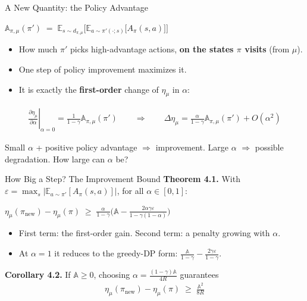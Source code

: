 \documentclass[aspectratio=169]{beamer}
\newcommand{\E}{\mathbb{E}}
\newcommand{\PA}{\mathbb{A}}              %
\newcommand{\pinew}{\pi_{\mathrm{new}}}
\begin{document}
\begin{frame}{A New Quantity: the Policy Advantage}
  \begin{formulabox}
    $\displaystyle \PA_{\pi,\mu}(\pi') \;=\; \E_{s\sim d_{\pi,\mu}}\Big[\E_{a\sim\pi'(\cdot;s)}\big[A_\pi(s,a)\big]\Big]$
  \end{formulabox}
  \begin{itemize}
    \item How much $\pi'$ picks high-advantage actions, \textbf{on the states $\pi$ visits} (from $\mu$).
    \item One step of policy improvement maximizes it.
    \item It is exactly the \textbf{first-order} change of $\eta_\mu$ in $\alpha$:
  \end{itemize}
  \begin{gather*}
    \left.\frac{\partial \eta_\mu}{\partial \alpha}\right|_{\alpha=0} = \frac{1}{1-\gamma}\PA_{\pi,\mu}(\pi')
    \qquad\Longrightarrow\qquad
    \Delta\eta_\mu = \frac{\alpha}{1-\gamma}\PA_{\pi,\mu}(\pi') + O(\alpha^2)
  \end{gather*}
  \begin{goodbox}
    \small Small $\alpha$ + positive policy advantage $\Rightarrow$ improvement. Large $\alpha$ $\Rightarrow$ possible degradation. How large can $\alpha$ be?
  \end{goodbox}
\end{frame}

\begin{frame}{How Big a Step? The Improvement Bound}
  \textbf{Theorem 4.1.} With $\varepsilon = \max_s \big|\E_{a\sim\pi'}[A_\pi(s,a)]\big|$, for all $\alpha\in[0,1]$:
  \begin{formulabox}
    $\displaystyle \eta_\mu(\pinew) - \eta_\mu(\pi) \;\ge\; \frac{\alpha}{1-\gamma}\Big(\PA - \frac{2\alpha\gamma\varepsilon}{1-\gamma(1-\alpha)}\Big)$
  \end{formulabox}
  \begin{itemize}
    \item First term: the first-order gain. Second term: a penalty growing with $\alpha$.
    \item At $\alpha=1$ it reduces to the greedy-DP form: $\frac{\PA}{1-\gamma} - \frac{2\gamma\varepsilon}{1-\gamma}$.
  \end{itemize}

  \vspace{4pt}
  \textbf{Corollary 4.2.} If $\PA \ge 0$, choosing $\alpha = \frac{(1-\gamma)\PA}{4R}$ guarantees
  \begin{gather*}
    \eta_\mu(\pinew) - \eta_\mu(\pi) \;\ge\; \frac{\PA^2}{8R}
  \end{gather*}
\end{frame}
\end{document}
